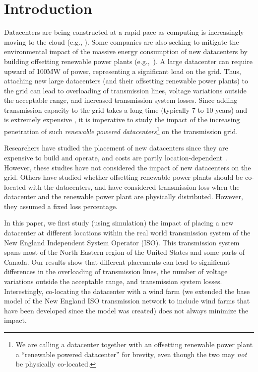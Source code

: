 \section{Introduction}
\label{sec:intro}

Datacenters are being constructed at a rapid pace as computing is increasingly moving to the cloud (e.g., \cite{RM14DCGrowth}).  Some companies are also seeking to mitigate the environmental impact of the massive energy consumption of new datacenters by building offsetting renewable power plants (e.g.,~\cite{GoogleGreen,Apple13,McGrawHill11}).  A large datacenter can require upward of 100MW of power, representing a significant load on the grid.  Thus, attaching new large datacenters (and their offsetting renewable power plants) to the grid can lead to overloading of transmission lines, voltage variations outside the acceptable range, and increased transmission system losses.
Since adding transmission capacity to the grid takes a long time (typically 7 to 10 years) and is extremely expensive \cite{interconnection2010survey}, it is imperative to study the impact of
the increasing penetration of such 
{\em renewable powered datacenters}\footnote{We are calling a datacenter together with an offsetting renewable power plant a ``renewable powered datacenter'' for brevity, even though the two may {\em not} be physically co-located.}
on the transmission grid.

Researchers have studied the placement of new datacenters since they are expensive to build and operate, and costs are partly location-dependent~\cite{Goiri11place,Dalger05,Boley09,larumbe2012optimal,berral2014building}.  However, these studies have not considered the impact of new datacenters on the grid.  Others have studied whether offsetting renewable power plants should be co-located with the datacenters\cite{Ren12MASCOTS}, and have considered transmission loss when the datacenter and the renewable power plant are physically distributed.  However, they assumed a fixed loss percentage.

In this paper, we first study (using simulation) the impact of placing
a new datacenter at different locations within the real world
transmission system of the New England Independent System Operator
(ISO).  This transmission system spans most of the North Eastern
region of the United States and some parts of Canada.  Our results
show that different placements can lead to significant differences in
the overloading of transmission lines, the number of voltage
variations outside the acceptable range, and transmission system
losses.  Interestingly, co-locating the datacenter with a wind farm
(we extended the base model of the New England ISO transmission
network to include wind farms that have been developed since the model
was created) does not always minimize the impact.


